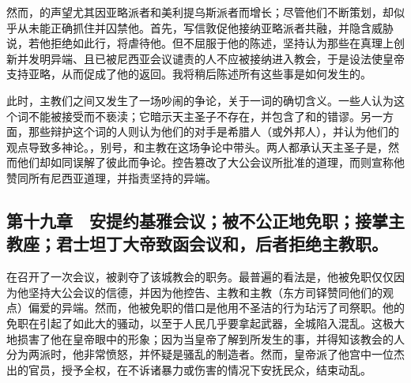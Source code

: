 然而，的声望尤其因亚略派者和美利提乌斯派者而增长；尽管他们不断策划，却似乎从未能正确抓住并囚禁他。首先，写信敦促他接纳亚略派者共融，并隐含威胁说，若他拒绝如此行，将虐待他。但不屈服于他的陈述，坚持认为那些在真理上创新并发明异端、且已被尼西亚会议谴责的人不应被接纳进入教会，于是设法使皇帝支持亚略，从而促成了他的返回。我将稍后陈述所有这些事是如何发生的。\par

此时，主教们之间又发生了一场吵闹的争论，关于一词的确切含义。一些人认为这个词不能被接受而不亵渎；它暗示天主圣子不存在，并包含了和的错谬。另一方面，那些辩护这个词的人则认为他们的对手是希腊人（或外邦人），并认为他们的观点导致多神论。，别号，和主教在这场争论中带头。两人都承认天主圣子是，然而他们却如同误解了彼此而争论。控告篡改了大公会议所批准的道理，而则宣称他赞同所有尼西亚道理，并指责坚持的异端。\par


\subsection{第十九章　安提约基雅会议；被不公正地免职；接掌主教座；君士坦丁大帝致函会议和，后者拒绝主教职。}

在召开了一次会议，被剥夺了该城教会的职务。最普遍的看法是，他被免职仅仅因为他坚持大公会议的信德，并因为他控告、主教和主教（东方司铎赞同他们的观点）偏爱的异端。然而，他被免职的借口是他用不圣洁的行为玷污了司祭职。他的免职在引起了如此大的骚动，以至于人民几乎要拿起武器，全城陷入混乱。这极大地损害了他在皇帝眼中的形象；因为当皇帝了解到所发生的事，并得知该教会的人分为两派时，他非常愤怒，并怀疑是骚乱的制造者。然而，皇帝派了他宫中一位杰出的官员，授予全权，在不诉诸暴力或伤害的情况下安抚民众，结束动乱。\par

